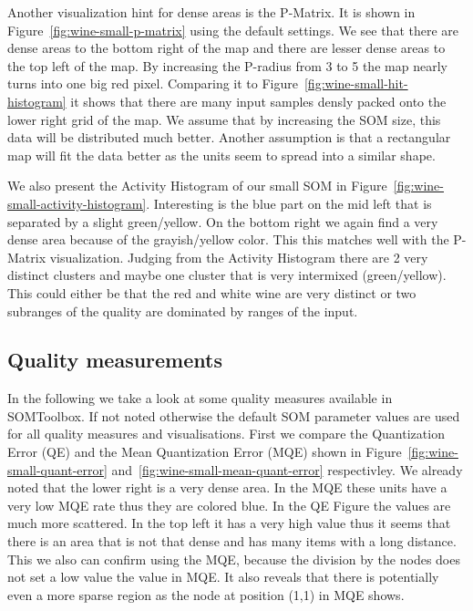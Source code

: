 \documentclass{acm_proc_article-sp}
\begin{document}
Another visualization hint for dense areas is the P-Matrix. It is shown in Figure~\ref{fig:wine-small-p-matrix} using
the default settings. We see that there are dense areas to the bottom right of the map and there are lesser
dense areas to the top left of the map.
By increasing the P-radius from 3 to 5 the map nearly turns into one big red pixel.
Comparing it to Figure~\ref{fig:wine-small-hit-histogram} it shows that there are many input samples densly packed
onto the lower right grid of the map. We assume that by increasing the SOM size, this data will be distributed much better. Another assumption is that a rectangular map will fit the data better as the units seem to spread into a similar shape.

We also present the Activity Histogram of our small SOM in Figure~\ref{fig:wine-small-activity-histogram}.
Interesting is the blue part on the mid left that is separated by a slight green/yellow.
On the bottom right we again find a very dense area because of the grayish/yellow color. This this matches
well with the P-Matrix visualization. Judging from the Activity Histogram there are 2 very distinct clusters
and maybe one cluster that is very intermixed (green/yellow). This could either be that the
red and white wine are very distinct or two subranges of the quality are dominated by ranges of the input.

\subsection{Quality measurements}

In the following we take a look at some quality measures available in SOMToolbox.
If not noted otherwise the default SOM parameter values are used for all quality measures and visualisations.
First we compare the Quantization Error (QE) and the Mean Quantization Error (MQE) shown in
Figure~\ref{fig:wine-small-quant-error} and~\ref{fig:wine-small-mean-quant-error} respectivley.
We already noted that the lower right is a very dense area. In the MQE these units have a very low
MQE rate thus they are colored blue. In the QE Figure the values are much more scattered. In
the top left it has a very high value thus it seems that there is an area that is not that dense
and has many items with a long distance. This we also can confirm using the MQE, because the division
by the nodes does not set a low value the value in MQE. It also reveals that there is potentially even a more sparse
region as the node at position (1,1) in MQE shows.
\end{document}
